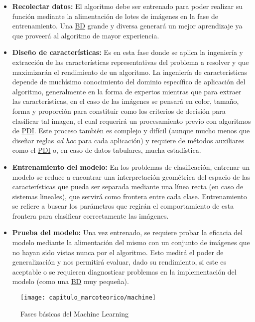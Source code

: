 \begin{itemize}
    \item{\textbf{Recolectar datos:}} El algoritmo debe ser entrenado para poder
    realizar su función mediante la alimentación de lotes de imágenes en la fase
    de entrenamiento. Una \hyperlink{abbr}{BD} grande y diversa generará un
    mejor aprendizaje ya que proveerá al algoritmo de mayor experiencia.
    \item{\textbf{Diseño de características:}} Es en esta fase donde se aplica
    la ingeniería y extracción de las características representativas del
    problema a resolver y que maximizarán el rendimiento de un algoritmo. La
    ingeniería de características depende de muchísimo conocimiento del dominio
    específico de aplicación del algoritmo, generalmente en la forma de expertos
    mientras que para extraer las características, en el caso de las imágenes se
    pensará en color, tamaño, forma y proporción para constituir como los
    criterios de decisión para clasificar tal imagen, el cual requerirá un
    procesamiento previo con algoritmos de \hyperlink{abbr}{PDI}. Este proceso
    también es complejo y difícil (aunque mucho menos que diseñar reglas
    \emph{ad hoc} para cada aplicación) y requiere de métodos auxiliares como el
    \hyperlink{abbr}{PDI} o, en caso de datos tabulares, mucha estadística.
    \item{\textbf{Entrenamiento del modelo:}} En los problemas de clasificación,
    entrenar un modelo se reduce a encontrar una interpretación geométrica del
    espacio de las características que pueda ser separada mediante una línea
    recta (en caso de sistemas lineales), que servirá como frontera entre cada
    clase. Entrenamiento se refiere a buscar los parámetros que regirán el
    comportamiento de esta frontera para clasificar correctamente las imágenes.
    \item{\textbf{Prueba del modelo:}} Una vez entrenado, se requiere probar la
    eficacia del modelo mediante la alimentación del mismo con un conjunto de
    imágenes que no hayan sido vistas nunca por el algoritmo. Esto medirá el
    poder de generalización y nos permitirá evaluar, dado su rendimiento, si
    este es aceptable o se requieren diagnosticar problemas en la implementación
    del modelo (como una \hyperlink{abbr}{BD} muy pequeña). 
\end{itemize}

\begin{figure}[H]
    \centering
    \texttt{[image: capitulo\_marcoteorico/machine]}
    \caption{Fases básicas del Machine Learning}\label{fig:machine}
\end{figure}


